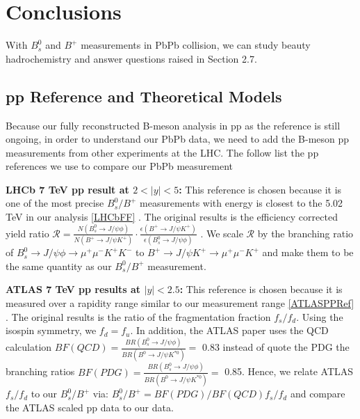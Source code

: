 \chapter{Conclusions}

With $B^0_s$ and $B^+$ measurements in PbPb collision, we can study beauty hadrochemistry and answer questions raised in Section 2.7.

\section{pp Reference and Theoretical Models}

Because our fully reconstructed B-meson analysis in pp as the reference is still ongoing, in order to understand our PbPb data, we need to add the B-meson pp measurements from other experiments at the LHC. The follow list the pp references we use to compare our PbPb measurement

\textbf{LHCb 7 TeV pp result at $2 < |y| < 5$:} This reference is chosen because it is one of the most precise $B^0_s/B^+$ measurements with energy is closest to the 5.02 TeV in our analysis \ref{LHCbFF} . The original results is the efficiency corrected yield ratio $\mathcal{R} = \frac{N(B^0_s \rightarrow J/\psi \phi)}{N(B^+ \rightarrow J/\psi K^+)} \cdot \frac{\epsilon(B^+ \rightarrow J/\psi K^+)}{\epsilon(B^0_s \rightarrow J/\psi \phi)}$ \cite{LHCbFF}. We scale $\mathcal{R}$ by the branching ratio of $B^0_s \rightarrow J/\psi \phi \rightarrow \mu^+\mu^- K^+ K^-$ to $B^+ \rightarrow J/\psi K^+ \rightarrow \mu^+\mu^- K^+$ and make them to be the same quantity as our $B^0_s/B^+$ measurement.

\textbf{ATLAS 7 TeV pp results at $|y| < 2.5$:} This reference is chosen because it is measured over a rapidity range similar to our measurement range \ref{ATLASPPRef} . The original results is the ratio of the fragmentation fraction $f_s/f_d$. Using the isospin symmetry, we $f_d = f_u$. In addition, the ATLAS paper uses the QCD calculation $BF(QCD) = \frac{BR(B^0_s \rightarrow J/\psi \phi)}{BR(B^0 \rightarrow J/\psi K^{*0})} =$ 0.83 instead of quote the PDG the branching ratios $BF(PDG) = \frac{BR(B^0_s \rightarrow J/\psi \phi)}{BR(B^0 \rightarrow J/\psi K^{*0})} =$ 0.85. Hence, we relate ATLAS $f_s/f_d$ to our $B^0_s/B^+$ via: $B^0_s/B^+ = BF(PDG)/BF(QCD) f_s/f_d$ and compare the ATLAS scaled pp data to our data.


